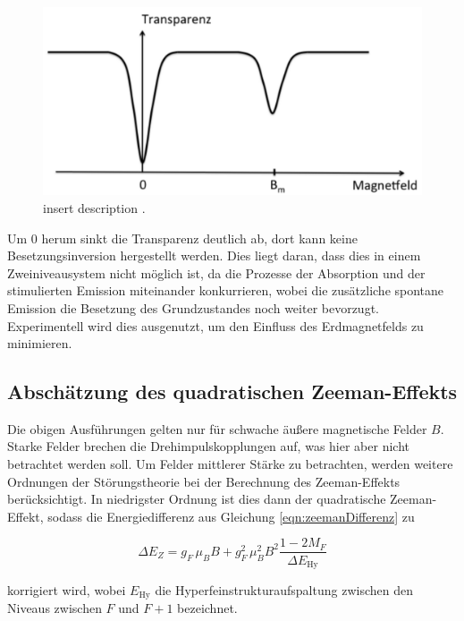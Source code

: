   \begin{figure}
    \centering
    \includegraphics[width=\textwidth]{pictures/transparenz.png}
    \caption{insert description \cite{stehendeWelle}.}
    \label{fig:transparenz}
  \end{figure}

  Um 0 herum sinkt die Transparenz deutlich ab, dort kann keine Besetzungsinversion hergestellt werden. Dies liegt daran, dass dies in einem Zweiniveausystem nicht möglich ist, da die Prozesse der Absorption und der stimulierten Emission miteinander konkurrieren, wobei die zusätzliche spontane Emission die Besetzung des Grundzustandes noch weiter bevorzugt. Experimentell wird dies ausgenutzt, um den Einfluss des Erdmagnetfelds zu minimieren.

  \subsection{Abschätzung des quadratischen Zeeman-Effekts}
  \label{subsec:quadratischerZeeman}

  Die obigen Ausführungen gelten nur für schwache äußere magnetische Felder $B$.
  Starke Felder brechen die Drehimpulskopplungen auf, was hier aber nicht betrachtet werden soll.
  Um Felder mittlerer Stärke zu betrachten, werden weitere Ordnungen der Störungstheorie bei der Berechnung des Zeeman-Effekts berücksichtigt. In niedrigster Ordnung ist dies dann der quadratische Zeeman-Effekt, sodass die Energiedifferenz aus Gleichung \eqref{eqn:zeemanDifferenz} zu

  \begin{equation}
    \Delta E_Z = g_F \, \mu_B B + g_F^2 \, \mu_B^2 B^2 \frac{1-2M_F}{\Delta E_{\text{Hy}}}
    \label{eqn:zeemanDifferenz}
  \end{equation}

  korrigiert wird, wobei $E_\text{Hy}$ die Hyperfeinstrukturaufspaltung zwischen den Niveaus zwischen $F$ und $F+1$ bezeichnet.

